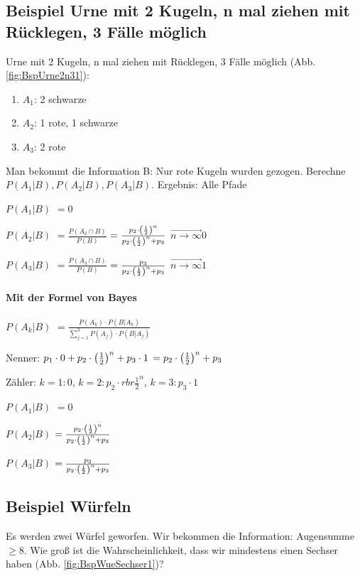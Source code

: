 \renewcommand{\ldate}{2015-11-17}

\subsection{Beispiel Urne mit 2 Kugeln, n mal ziehen mit Rücklegen, 3 Fälle möglich}
Urne mit 2 Kugeln, n mal ziehen mit Rücklegen, 3 Fälle möglich (Abb. \ref{fig:BspUrne2n31}): 
\begin{enumerate}
\item $A_1$: 2 schwarze
\item $A_2$: 1 rote, 1 schwarze
\item $A_3$: 2 rote
\end{enumerate}
Man bekommt die Information B: Nur rote Kugeln wurden gezogen.
Berechne $P(A_1|B), P(A_2|B), P(A_3|B)$. 
Ergebnis: Alle Pfade

$P(A_1|B)$
$=0$

$P(A_2|B)$
$=\frac{P(A_2\cap B)}{P(B)}$
$=\frac{p_2 \cdot  \left( \frac{1}{2} \right) ^n}{p_2 \cdot  \left( \frac{1}{2} \right) ^n + p_3}$
$\overrightarrow{n\rightarrow \infty} 0$

$P(A_3|B)$
$=\frac{P(A_3\cap B)}{P(B)}$
$=\frac{p_3}{p_2 \cdot  \left( \frac{1}{2} \right) ^n + p_3}$
$\overrightarrow{n\rightarrow \infty} 1$

\paragraph{Mit der Formel von Bayes}
$P(A_k|B)$
$=\frac{P(A_k) \cdot P(B|A_k)}{\sum_{j=1}^{3} P(A_j) \cdot P(B|A_j)}$

Nenner: $p_1 \cdot 0 + p_2 \cdot  \left( \frac{1}{2} \right) ^n + p_3 \cdot 1 $
$=p_2 \cdot  \left( \frac{1}{2} \right) ^n + p_3 $

Zähler: $k=1: 0$, $k=2: p_2 \cdot rbr{\frac{1}{2}}^n$, $k=3: p_3 \cdot 1$

$P(A_1|B)$
$=0$

$P(A_2|B)$
$=\frac{p_2 \cdot  \left( \frac{1}{2} \right) ^n}{p_2 \cdot  \left( \frac{1}{2} \right) ^n + p_3}$

$P(A_3|B)$
$=\frac{p_3}{p_2 \cdot  \left( \frac{1}{2} \right) ^n + p_3}$

\subsection{Beispiel Würfeln}
Es werden zwei Würfel geworfen. Wir bekommen die Information: Augensumme $\geq 8$. Wie groß ist die Wahrscheinlichkeit, dass wir mindestens einen Sechser haben (Abb. \ref{fig:BspWueSechser1})?

